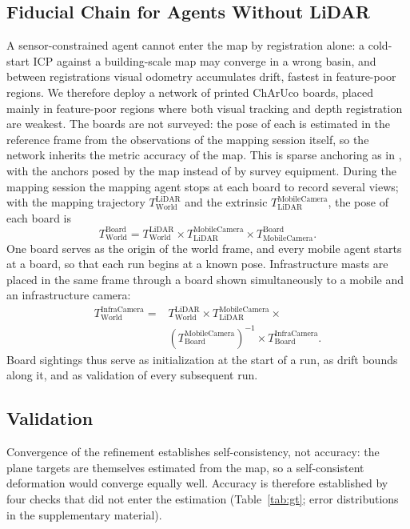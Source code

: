 \documentclass[journal]{IEEEtran}
\newcommand{\Ttransform}[2]{\ensuremath{T_{\mathrm{#1}}^{\mathrm{#2}}}}
\begin{document}
\subsection{Fiducial Chain for Agents Without LiDAR}
\label{sec:fiducials}
A sensor-constrained agent cannot enter the map by registration alone:
a cold-start ICP against a building-scale map may converge in a wrong
basin, and between registrations visual odometry accumulates drift,
fastest in feature-poor regions. We therefore deploy a network of
printed ChArUco boards, placed mainly in feature-poor regions where
both visual tracking and depth registration are weakest. The boards
are not surveyed: the pose of each is estimated in the reference frame
from the observations of the mapping session itself, so the network
inherits the metric accuracy of the map. This is sparse anchoring as
in \cite{airmuseum}, with the anchors posed by the map instead of by
survey equipment. During the mapping session the mapping agent stops
at each board to record several views; with the mapping trajectory
\Ttransform{World}{LiDAR} and the extrinsic
\Ttransform{LiDAR}{MobileCamera}, the pose of each board is
\begin{equation}
   \Ttransform{World}{Board} = \Ttransform{World}{LiDAR} \times \Ttransform{LiDAR}{MobileCamera} \times \Ttransform{MobileCamera}{Board} .
   \label{eq:board_chain}
\end{equation}
One board serves as the origin of the world frame, and every mobile
agent starts at a board, so that each run begins at a known pose.
Infrastructure masts are placed in the same frame through a board shown
simultaneously to a mobile and an infrastructure camera:
\begin{equation}
\begin{split}
  \Ttransform{World}{InfraCamera} = {}
    & \Ttransform{World}{LiDAR} \times \Ttransform{LiDAR}{MobileCamera} \times \\
    &  (\Ttransform{Board}{MobileCamera})^{-1} \times \Ttransform{Board}{InfraCamera} .
\end{split}
\label{eq:infra_camera_chain}
\end{equation}
Board sightings thus serve as initialization at the start of a run, as
drift bounds along it, and as validation of every subsequent run.

\subsection{Validation}
\label{sec:gt_val}
Convergence of the refinement establishes self-consistency, not
accuracy: the plane targets are themselves estimated from the map, so
a self-consistent deformation would converge equally well. Accuracy is
therefore established by four checks that did not enter the
estimation (Table~\ref{tab:gt}; error distributions in the
supplementary material).
\end{document}
